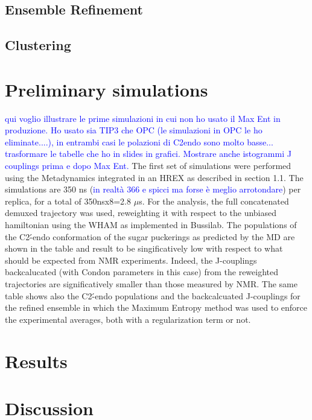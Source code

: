 \documentclass[paper]{article}
\newcommand{\vp}{\textcolor{blue} }
\begin{document}
\subsection{Ensemble Refinement}
\subsection{Clustering}
\section{Preliminary simulations}
\vp{qui voglio illustrare le prime simulazioni in cui non ho usato il Max Ent in produzione. Ho usato sia TIP3 che OPC (le simulazioni in OPC le ho eliminate....), in entrambi casi le polazioni di C2endo sono molto basse... trasformare le tabelle che ho in slides in grafici. Mostrare anche istogrammi J couplings prima e dopo Max Ent.} 
The first set of simulations were performed using the Metadynamics integrated in an HREX as described in section 1.1. The simulations are 350 ns (\vp{in realtà 366 e spicci ma forse è meglio arrotondare}) per replica, for a total of 350nsx8=2.8 $\mu$s. For the analysis, the full concatenated demuxed trajectory was used, reweighting it with respect to the unbiased hamiltonian using the WHAM as implemented in Bussilab. The populations of the C2\'-endo conformation of the sugar puckerings as predicted by the MD are shown in the table and result to be singificatively low with respect to what should be expected from NMR experiments. Indeed, the J-couplings backcalucated (with Condon parameters in this case) from the reweighted trajectories are significatively smaller than those measured by NMR. The same table shows also the C2\'-endo populations and the backcalcuated J-couplings for the refined ensemble in which the Maximum Entropy method was used to enforce the experimental averages, both with a regularization term or not. 

\section{Results}
\section{Discussion}



\end{document}
